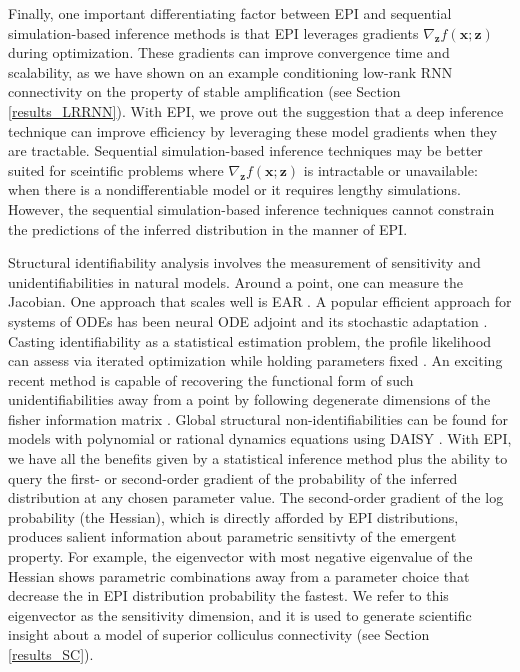 \documentclass[11pt]{article}
\begin{document}
Finally, one important differentiating factor between EPI and sequential simulation-based inference methods is that EPI leverages gradients $\nabla_{\mathbf{z}} f(\mathbf{x}; \mathbf{z})$ during optimization.
These gradients can improve convergence time and scalability, as we have shown on an example conditioning low-rank RNN connectivity on the property of stable amplification (see Section \ref{results_LRRNN}).
With EPI, we prove out the suggestion that a deep inference technique can improve efficiency by leveraging these model gradients when they are tractable.
Sequential simulation-based inference techniques may be better suited for sceintific problems where $\nabla_{\mathbf{z}} f(\mathbf{x}; \mathbf{z})$ is intractable or unavailable: when there is a nondifferentiable model or it requires lengthy simulations.
However, the sequential simulation-based inference techniques cannot constrain the predictions of the inferred distribution in the manner of EPI.

Structural identifiability analysis involves the measurement of sensitivity and unidentifiabilities in natural models.
Around a point, one can measure the Jacobian. One approach that scales well is EAR \cite{karlsson2012efficient}.
A popular efficient approach for systems of ODEs has been neural ODE adjoint \cite{chen2018neural} and its stochastic adaptation \cite{li2020scalable}.
Casting identifiability as a statistical estimation problem, the profile likelihood can assess via iterated optimization while holding parameters fixed \cite{raue2009structural}.
An exciting recent method is capable of recovering the functional form of such unidentifiabilities away from a point by following degenerate dimensions of the fisher information matrix \cite{raman2017delineating}.
Global structural non-identifiabilities can be found for models with polynomial or rational dynamics equations using DAISY \cite{saccomani2003parameter}.
With EPI, we have all the benefits given by a statistical inference method plus the ability to query the first- or second-order gradient of the probability of the inferred distribution at any chosen parameter value.
The second-order gradient of the log probability (the Hessian), which is directly afforded by EPI distributions, produces salient information about parametric sensitivty of the emergent property.
For example, the eigenvector with most negative eigenvalue of the Hessian shows parametric combinations away from a parameter choice that decrease the in EPI distribution probability the fastest.
We refer to this eigenvector as the sensitivity dimension, and it is used to generate scientific insight about a model of superior colliculus connectivity (see Section \ref{results_SC}). 
\end{document}
